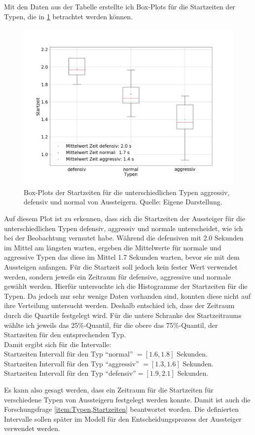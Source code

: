 Mit den Daten aus der Tabelle erstellte ich Box-Plots für die Startzeiten der Typen, die in \figurename \ref{fig:BoxPlotStartingTime} betrachtet werden können.
\begin{figure}[H]
	\centering
		\includegraphics[width=1.0\textwidth]{pictures/data_evaluation/types/starting_time/starting_times.png}
	\caption{Box-Plots der Startzeiten für die unterschiedlichen Typen aggressiv, defensiv und normal von Aussteigern. Quelle: Eigene Darstellung.}
	\label{fig:BoxPlotStartingTime}
\end{figure}
Auf diesem Plot ist zu erkennen, dass sich die Startzeiten der Aussteiger für die unterschiedlichen Typen defensiv, aggressiv und normale unterscheidet, wie ich bei der Beobachtung vermutet habe. Während die defensiven mit 2.0 Sekunden im Mittel am längsten warten, ergeben die Mittelwerte für normale und aggressive Typen das diese im Mittel 1.7  Sekunden warten, bevor sie mit dem Aussteigen anfangen. Für die Startzeit soll jedoch kein fester Wert verwendet werden, sondern jeweils ein Zeitraum für defensive, aggressive und normale gewählt werden. Hierfür untersuchte ich die Histogramme der Startzeiten für die Typen. Da jedoch nur sehr wenige Daten vorhanden sind, konnten diese nicht auf ihre Verteilung untersucht werden. Deshalb entschied ich, dass der Zeitraum durch die Quartile festgelegt wird. Für die untere Schranke des Startzeitraums wählte ich jeweils das 25\%-Quantil, für die obere das 75\%-Quantil, der Startzeiten für den entsprechenden Typ. \\ 
Damit ergibt sich für die Intervalle: \\
Startzeiten Intervall für den Typ "`normal"' $= [1.6, 1.8]$ Sekunden. \\
Startzeiten Intervall für den Typ "`aggressiv"' $= [1.3, 1.6]$ Sekunden. \\
Startzeiten Intervall für den Typ "`defensiv"'$= [1.9, 2.1]$ Sekunden. 

Es kann also gesagt werden, dass ein Zeitraum für die Startzeiten für verschiedene Typen von Aussteigern festgelegt werden konnte. Damit ist auch die Forschungsfrage \ref{item:Typen,Startzeiten} beantwortet worden. Die definierten Intervalle sollen später im Modell für den Entscheidungsprozess der Aussteiger verwendet werden.
